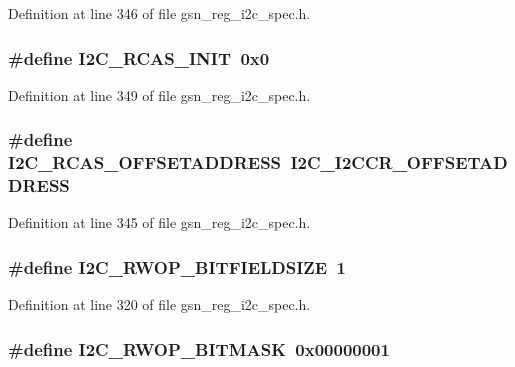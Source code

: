 Definition at line 346 of file gsn\_\-reg\_\-i2c\_\-spec.h.

\hypertarget{a00558_ab09d09b71faf04ac627a5a04a7a2b7ea}{
\subsubsection[{I2C\_\-RCAS\_\-INIT}]{\setlength{\rightskip}{0pt plus 5cm}\#define I2C\_\-RCAS\_\-INIT~0x0}}
\label{a00558_ab09d09b71faf04ac627a5a04a7a2b7ea}


Definition at line 349 of file gsn\_\-reg\_\-i2c\_\-spec.h.

\hypertarget{a00558_a7bf10faba963abf321f4394fe0d1ca8a}{
\subsubsection[{I2C\_\-RCAS\_\-OFFSETADDRESS}]{\setlength{\rightskip}{0pt plus 5cm}\#define I2C\_\-RCAS\_\-OFFSETADDRESS~I2C\_\-I2CCR\_\-OFFSETADDRESS}}
\label{a00558_a7bf10faba963abf321f4394fe0d1ca8a}


Definition at line 345 of file gsn\_\-reg\_\-i2c\_\-spec.h.

\hypertarget{a00558_abe2e481dff55ba68056cc3bd68b83f52}{
\subsubsection[{I2C\_\-RWOP\_\-BITFIELDSIZE}]{\setlength{\rightskip}{0pt plus 5cm}\#define I2C\_\-RWOP\_\-BITFIELDSIZE~1}}
\label{a00558_abe2e481dff55ba68056cc3bd68b83f52}


Definition at line 320 of file gsn\_\-reg\_\-i2c\_\-spec.h.

\hypertarget{a00558_a52e598b16c770284a6de2f90dd2ea820}{
\subsubsection[{I2C\_\-RWOP\_\-BITMASK}]{\setlength{\rightskip}{0pt plus 5cm}\#define I2C\_\-RWOP\_\-BITMASK~0x00000001}}
\label{a00558_a52e598b16c770284a6de2f90dd2ea820}


